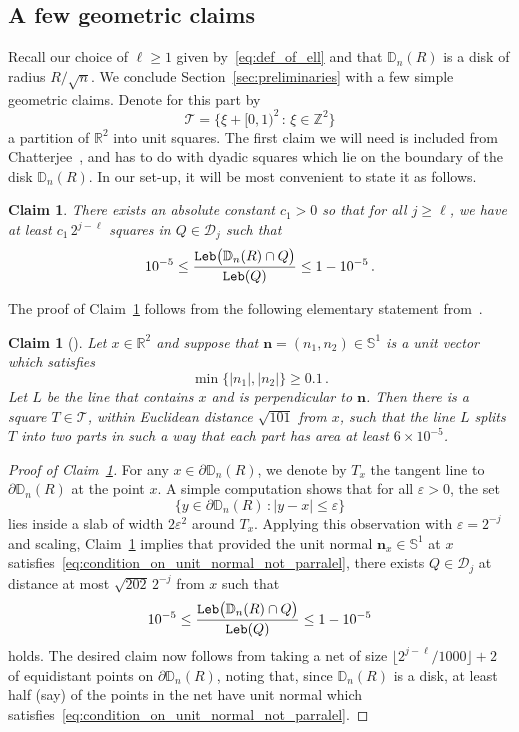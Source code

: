 \documentclass[11pt]{amsart}
\newtheorem{claim}[theorem]{Claim}
\theoremstyle{definition}
\theoremstyle{remark}
\numberwithin{equation}{section}
\def\eps{{\varepsilon}}
\newcommand{\bR}{\mathbb R}
\newcommand{\bZ}{\mathbb Z}
\newcommand{\bD}{\mathbb D}
\newcommand{\bS}{\mathbb S}
\begin{document}
	\subsection{A few geometric claims}
	Recall our choice of $\ell \ge 1$ given by~\eqref{eq:def_of_ell} and that $\bD_n(R)$ is a disk of radius $R/\sqrt{n}$. We conclude Section~\ref{sec:preliminaries} with a few simple geometric claims. Denote for this part by
	$$\mathcal{T} = \big\{ \xi + [0,1)^2 \, : \, \xi \in \bZ^2 \big\}$$ a partition of $\bR^2$ into unit squares. 
	The first claim we will need is included from Chatterjee~\cite{chatterjee}, and has to do with dyadic squares which lie on the boundary of the disk $\bD_n(R)$. In our set-up, it will be most convenient to state it as follows.
	\begin{claim}
		\label{claim:enough boundary_cubes_are_good}
		There exists an absolute constant $c_1>0$ so that for all $j\ge \ell$, we have at least $c_1\, 2^{j-\ell}$ squares in $Q\in \mathcal{D}_j$ such that
		\begin{equation*}
			10^{-5} \le \frac{{\tt Leb}\big(\bD_n(R) \cap Q\big)}{{\tt Leb}(Q)} \le 1- 10^{-5} \, .
		\end{equation*} 
	\end{claim}
	The proof of Claim~\ref{claim:enough boundary_cubes_are_good} follows from the following elementary statement from~\cite{chatterjee}. 
	\begin{claim}[{\cite[Lemma~3.12]{chatterjee}}]
		\label{claim:geometric_claim_from_chatterjee}
		Let $x\in \bR^2$ and suppose that $\mathbf{n} =(n_1,n_2) \in \bS^1$ is a unit vector which satisfies
		\begin{equation}
			\label{eq:condition_on_unit_normal_not_parralel}
			\min\big\{ |n_1|, |n_2| \big\} \ge 0.1 \, .
		\end{equation}
		Let $L$ be the line that contains $x$ and is perpendicular to $\mathbf{n}$. Then there is a square $T \in \mathcal{T}$, within Euclidean distance $\sqrt{101}$ from $x$, such that the line $L$ splits $T$ into two parts in such a way that each part has area at least $6\times 10^{-5}$.
	\end{claim}
	\begin{proof}[Proof of Claim~\ref{claim:enough boundary_cubes_are_good}]
		For any $x\in \partial \bD_n(R)$, we denote by $T_x$ the tangent line to $\partial \bD_n(R)$ at the point $x$. A simple computation shows that for all $\eps>0$, the set $$\{ y\in\partial \bD_n(R) \, : |y-x|\le \eps \}$$ lies inside a slab of width $2 \eps^2$ around $T_x$. Applying this observation with $\eps = 2^{-j}$ and scaling, Claim~\ref{claim:geometric_claim_from_chatterjee} implies that provided the unit normal $\mathbf{n}_x\in \bS^1$ at $x$ satisfies~\eqref{eq:condition_on_unit_normal_not_parralel}, there exists $Q\in \mathcal{D}_j$ at distance at most $\sqrt{202} \, 2^{-j}$ from $x$ such that
		\[
		10^{-5} \le \frac{{\tt Leb}\big(\bD_n(R) \cap Q\big)}{{\tt Leb}(Q)} \le 1- 10^{-5} 
		\]
		holds. The desired claim now follows from taking a net of size $\lfloor2^{j-\ell}/1000 \rfloor + 2$ of equidistant points on $\partial \bD_n(R)$, noting that, since $\bD_n(R)$ is a disk, at least half (say) of the points in the net have unit normal which satisfies~\eqref{eq:condition_on_unit_normal_not_parralel}.
	\end{proof}
\end{document}
